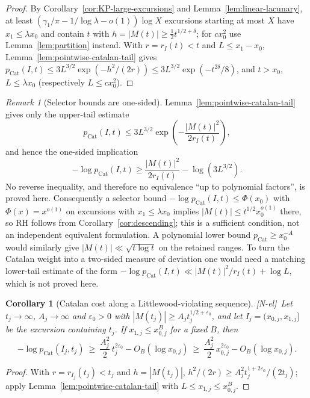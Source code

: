 \documentclass[11pt]{amsart}
\numberwithin{equation}{section}
\theoremstyle{plain}
\newtheorem{corollary}[theorem]{Corollary}
\theoremstyle{definition}
\theoremstyle{remark}
\newtheorem{remark}[theorem]{Remark}
\newcommand{\eps}{\varepsilon}
\newcommand{\tagNE}{\textup{[N-el]}}
\begin{document}
\begin{proof}
By Corollary~\ref{cor:KP-large-excursions} and Lemma~\ref{lem:linear-lacunary},
at least $(\gamma_1/\pi-1/\log\lambda-o(1))\log X$ excursions starting at
most $X$ have $x_1\le\lambda x_0$ and contain $t$ with
$h=|M(t)|\ge\frac12t^{1/2+\delta}$; for $cx_0^2$ use
Lemma~\ref{lem:partition} instead. With $r=r_I(t)<t$ and $L\le x_1-x_0$,
Lemma~\ref{lem:pointwise-catalan-tail} gives
$p_{\mathrm{Cat}}(I,t)\le3L^{3/2}\exp(-h^2/(2r))\le3L^{3/2}\exp(-t^{2\delta}/8)$,
and $t>x_0$, $L\le\lambda x_0$ (respectively $L\le cx_0^2$).
\end{proof}

\begin{remark}[Selector bounds are one-sided]
\label{rem:catalan-selector-gap}
Lemma~\ref{lem:pointwise-catalan-tail} gives only the upper-tail estimate
\[
 p_{\mathrm{Cat}}(I,t)
 \le 3L^{3/2}\exp\!\left(-\frac{|M(t)|^2}{2r_I(t)}\right),
\]
and hence the one-sided implication
\[
 -\log p_{\mathrm{Cat}}(I,t)
 \ge \frac{|M(t)|^2}{2r_I(t)}-\log(3L^{3/2}).
\]
No reverse inequality, and therefore no equivalence ``up to polynomial
factors'', is proved here.  Consequently a selector bound
$-\log p_{\mathrm{Cat}}(I,t)\le\Phi(x_0)$ with
$\Phi(x)=x^{o(1)}$ on excursions with $x_1\le\lambda x_0$ implies
$|M(t)|\le t^{1/2}x_0^{o(1)}$ there, so RH follows from
Corollary~\ref{cor:descending}; this is a sufficient condition, not an
independent equivalent formulation.  A polynomial lower bound
$p_{\mathrm{Cat}}\ge x_0^{-A}$ would similarly give
$|M(t)|\ll\sqrt{t\log t}$ on the retained ranges.  To turn the Catalan
weight into a two-sided measure of deviation one would need a matching
lower-tail estimate of the form
$-\log p_{\mathrm{Cat}}(I,t)\ll |M(t)|^2/r_I(t)+\log L$, which is not proved
here.
\end{remark}

\begin{corollary}[Catalan cost along a Littlewood-violating sequence]
\label{cor:catalan-sequence}
\tagNE\ Let $t_j\to\infty$, $A_j\to\infty$ and $\eps_0>0$ with
$|M(t_j)|\ge A_jt_j^{1/2+\eps_0}$, and let $I_j=(x_{0,j},x_{1,j}]$ be the
excursion containing $t_j$. If $x_{1,j}\le x_{0,j}^{B}$ for a fixed $B$,
then
\[
-\log p_{\mathrm{Cat}}(I_j,t_j)\ \ge\ \frac{A_j^2}{2}\,t_j^{2\eps_0}
-O_B(\log x_{0,j})\ \ge\ \frac{A_j^2}{2}\,x_{0,j}^{2\eps_0}-O_B(\log x_{0,j}).
\]
\end{corollary}

\begin{proof}
With $r=r_{I_j}(t_j)<t_j$ and $h=|M(t_j)|$,
$h^2/(2r)\ge A_j^2t_j^{1+2\eps_0}/(2t_j)$; apply
Lemma~\ref{lem:pointwise-catalan-tail} with $L\le x_{1,j}\le x_{0,j}^B$.
\end{proof}
\end{document}
